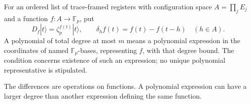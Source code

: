 \begin{definition}
For an ordered list of trace-framed registers with configuration space
$A=\prod_jE_j$ and a function $f:A\to\mathbb F_p$, put
\[
 D_f|t\rangle=\zeta_p^{f(t)}|t\rangle,\qquad
 \delta_hf(t)=f(t)-f(t-h)\quad(h\in A).
\]
A polynomial of total degree at most $m$ means a polynomial expression
in the coordinates of named $\mathbb F_p$-bases, representing $f$, with
that degree bound.  The condition concerns existence of such an expression;
no unique polynomial representative is stipulated.
\end{definition}
\begin{scope}
The differences are operations on functions.  A polynomial expression can
have a larger degree than another expression defining the same function.
\end{scope}

